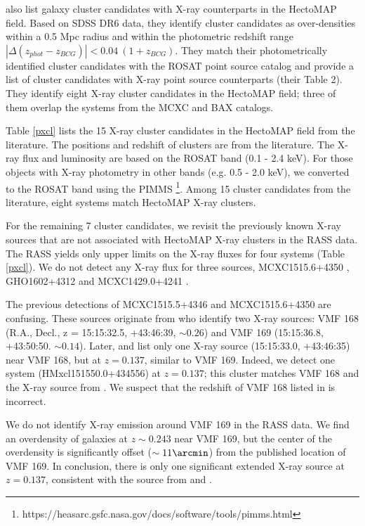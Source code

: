 \documentclass[iop, apj]{emulateapj}
\begin{document}
\citet{Wen09} also list galaxy cluster candidates with X-ray counterparts 
 in the HectoMAP field. 
Based on SDSS DR6 data, 
 they identify cluster candidates as over-densities  
 within a 0.5 Mpc radius and within the photometric redshift range 
 $|\Delta (z_{phot} - z_{BCG})| < 0.04~(1 + z_{BCG})$. 
They match their photometrically identified cluster candidates 
 with the ROSAT point source catalog and 
 provide a list of cluster candidates with X-ray point source counterparts
 (their Table 2).
They identify eight X-ray cluster candidates in the HectoMAP field;
 three of them overlap the systems from the MCXC and BAX catalogs. 

Table \ref{pxcl} lists the 15 X-ray cluster candidates in the HectoMAP field 
 from the literature. 
The positions and redshift of clusters are from the literature. 
The X-ray flux and luminosity are based on the ROSAT band (0.1 - 2.4 keV). 
For those objects with X-ray photometry in other bands (e.g. 0.5 - 2.0 keV), 
 we converted to the ROSAT band using the PIMMS 
 \footnote{https://heasarc.gsfc.nasa.gov/docs/software/tools/pimms.html}. 
Among 15 cluster candidates from the literature, 
 eight systems match HectoMAP X-ray clusters. 

For the remaining 7 cluster candidates, 
 we revisit the previously known X-ray sources 
 that are not associated with HectoMAP X-ray clusters in the RASS data.
The RASS yields only upper limits on the X-ray fluxes for four systems (Table \ref{pxcl}). 
We do not detect any X-ray flux for three sources, 
 MCXC1515.6+4350 \citep{Vikhlinin98}, 
 GHO1602+4312 \citep{Lubin04} and 
 MCXC1429.0+4241 \citep{Horner08}.
 
The previous detections of MCXC1515.5+4346 and MCXC1515.6+4350 are confusing. 
These sources originate from \citet{Vikhlinin98} who identify two X-ray sources:
 VMF 168 (R.A., Decl., z = 15:15:32.5, +43:46:39, $\sim0.26$) and 
 VMF 169 (15:15:36.8, +43:50:50. $\sim0.14$). 
Later, \citet{Burenin07} and \citet{Voevodkin10} list only one X-ray source (15:15:33.0, +43:46:35) 
 near VMF 168, but at $z = 0.137$, similar to VMF 169. 
Indeed, we detect one system (HMxcl151550.0+434556) at $z = 0.137$;
 this cluster matches VMF 168 and the X-ray source from \citet{Burenin07}. 
We suspect that the redshift of VMF 168 listed in \citet{Vikhlinin98} is incorrect.

We do not identify X-ray emission around VMF 169 in the RASS data.
We find an overdensity of galaxies at $z \sim 0.243$ near VMF 169, 
 but the center of the overdensity is significantly offset ($\sim 11\arcmin$) from the published location of VMF 169.
In conclusion, there is only one significant extended X-ray source at $z = 0.137$,
 consistent with the source from \citet{Burenin07} and \citet{Voevodkin10}. 
 
\end{document}

